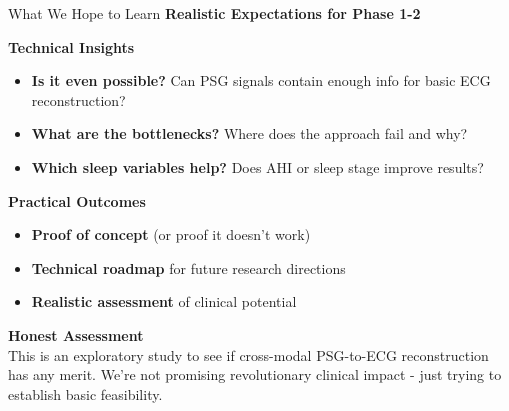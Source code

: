 \documentclass[aspectratio=169,11pt]{beamer}
\begin{document}
\begin{frame}{What We Hope to Learn}
  \textbf{\textcolor{tcairemblue}{\Large Realistic Expectations for Phase 1-2}}
  
  \vspace{1em}
  \textbf{\textcolor{tcairemgreen}{\large Technical Insights}}
  \begin{itemize}
    \large
    \item \textbf{Is it even possible?} Can PSG signals contain enough info for basic ECG reconstruction?
    \vspace{0.5em}
    \item \textbf{What are the bottlenecks?} Where does the approach fail and why?
    \vspace{0.5em}
    \item \textbf{Which sleep variables help?} Does AHI or sleep stage improve results?
  \end{itemize}
  
  \vspace{1.5em}
  \textbf{\textcolor{tcairemorange}{\large Practical Outcomes}}
  \begin{itemize}
    \large
    \item \textbf{Proof of concept} (or proof it doesn't work)
    \vspace{0.5em}
    \item \textbf{Technical roadmap} for future research directions
    \vspace{0.5em}
    \item \textbf{Realistic assessment} of clinical potential
  \end{itemize}
  
  \vspace{1.5em}
  \colorbox{tcairemblue!15}{\parbox{0.95\textwidth}{
    \large
    \textcolor{tcairemblue}{\textbf{Honest Assessment}}\\
    \vspace{0.5em}
    \normalsize
    This is an exploratory study to see if cross-modal PSG-to-ECG reconstruction has any merit. 
    We're not promising revolutionary clinical impact - just trying to establish basic feasibility.
  }}
\end{frame}
\fi
\end{document}

